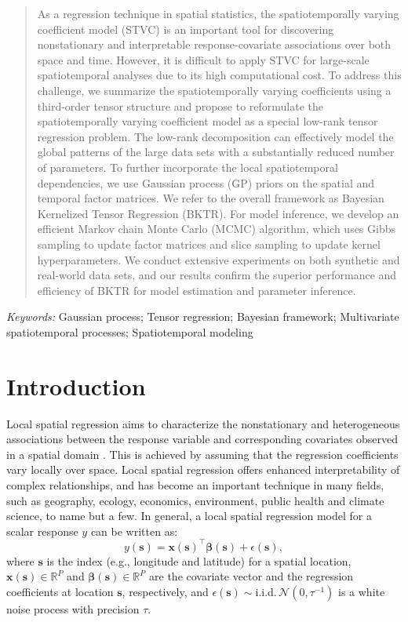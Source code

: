 \documentclass[12pt]{article}
\newcommand{\R}{\mathbb{R}}
\newcommand{\bd}[1]{\boldsymbol{#1}}
\begin{document}
\begin{abstract}
As a regression technique in spatial statistics, the spatiotemporally varying coefficient model (STVC) is an important tool for discovering nonstationary and interpretable response-covariate associations over both space and time. However, it is difficult to apply STVC for large-scale spatiotemporal analyses due to its high computational cost. To address this challenge, we summarize the spatiotemporally varying coefficients using a third-order tensor structure and propose to reformulate the spatiotemporally varying coefficient model as a special low-rank tensor regression problem. The low-rank decomposition can effectively model the global patterns of the large data sets with a substantially reduced number of parameters. To further incorporate the local spatiotemporal dependencies, we use Gaussian process (GP) priors on the spatial and temporal factor matrices. We refer to the overall framework as Bayesian Kernelized Tensor Regression (BKTR). For model inference, we develop an efficient Markov chain Monte Carlo (MCMC) algorithm, which uses Gibbs sampling to update factor matrices and slice sampling to update kernel hyperparameters. We conduct extensive experiments on both synthetic and real-world data sets, and our results confirm the superior performance and efficiency of BKTR for model estimation and parameter inference.
\end{abstract}

\noindent%
{\it Keywords:} Gaussian process; Tensor regression; Bayesian framework; Multivariate spatiotemporal processes; Spatiotemporal modeling
\vfill

{} %
\section{Introduction}
\label{sec:intro}

Local spatial regression aims to characterize the nonstationary and heterogeneous associations between the response variable and corresponding covariates observed in a spatial domain \citep{banerjee2014hierarchical,cressie2015statistics}. This is achieved by assuming that the regression coefficients vary locally over space. Local spatial regression offers enhanced interpretability of complex relationships, and has become an important technique in many fields, such as geography, ecology, economics, environment, public health and climate science, to name but a few. In general, a local spatial regression model for a scalar response $y$ can be written as:
\begin{equation}\label{eq:svc}
    y(\boldsymbol{s}) = \bd{x}(\boldsymbol{s})^{\top} \bd{\beta}(\bd{s})+ \epsilon(\bd{s}),
\end{equation}
where $\bd{s}$ is the index (e.g., longitude and latitude) for a spatial location, $\bd{x}(\bd{s})\in\mathbb{R}^P$ and $\bd{\beta}(\bd{s})\in\R^{P}$ are the covariate vector and the regression coefficients at location $\bd{s}$, respectively, and $\epsilon(\bd{s})\sim \text{i.i.d.}\,\mathcal{N}(0,\tau^{-1})$ is a white noise process with precision $\tau$.
\end{document}
